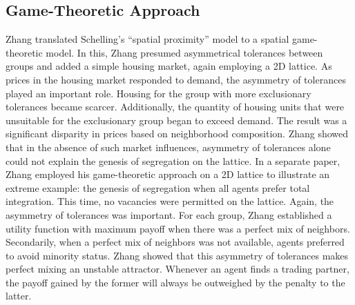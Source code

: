 \documentclass[a4paper]{article}
\begin{document}
\subsection{Game-Theoretic Approach}
Zhang \cite{zhang2004dynamic} translated Schelling’s “spatial proximity” model to a spatial game-theoretic model. In this, Zhang presumed asymmetrical tolerances between groups and added a simple housing market, again employing a 2D lattice. As prices in the housing market responded to demand, the asymmetry of tolerances played an important role. Housing for the group with more exclusionary tolerances became scarcer. Additionally, the quantity of housing units that were unsuitable for the exclusionary group began to exceed demand. The result was a significant disparity in prices based on neighborhood composition. Zhang showed that in the absence of such market influences, asymmetry of tolerances alone could not explain the genesis of segregation on the lattice.
In a separate paper, Zhang \cite{zhang2004residential} employed his game-theoretic approach on a 2D lattice to illustrate an extreme example: the genesis of segregation when all agents prefer total integration. This time, no vacancies were permitted on the lattice. Again, the asymmetry of tolerances was important. For each group, Zhang established a utility function with maximum payoff when there was a perfect mix of neighbors. Secondarily, when a perfect mix of neighbors was not available, agents preferred to avoid minority status. Zhang showed that this asymmetry of tolerances makes perfect mixing an unstable attractor. Whenever an agent finds a trading partner, the payoff gained by the former will always be outweighed by the penalty to the latter.
\end{document}

